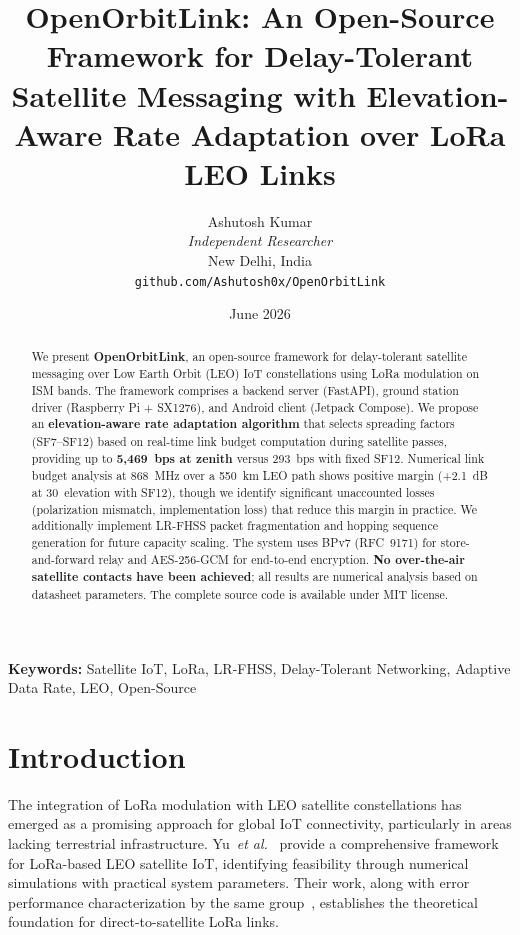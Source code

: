 \documentclass[11pt,a4paper]{article}
\title{\textbf{OpenOrbitLink: An Open-Source Framework for Delay-Tolerant Satellite Messaging with Elevation-Aware Rate Adaptation over LoRa LEO Links}}
\author{
  Ashutosh Kumar\\
  \textit{Independent Researcher}\\
  New Delhi, India\\
  \texttt{github.com/Ashutosh0x/OpenOrbitLink}
}
\date{June 2026}
\begin{document}
\maketitle

\begin{abstract}
We present \textbf{OpenOrbitLink}, an open-source framework for delay-tolerant satellite messaging over Low Earth Orbit (LEO) IoT constellations using LoRa modulation on ISM bands. The framework comprises a backend server (FastAPI), ground station driver (Raspberry Pi + SX1276), and Android client (Jetpack Compose). We propose an \textbf{elevation-aware rate adaptation algorithm} that selects spreading factors (SF7--SF12) based on real-time link budget computation during satellite passes, providing up to \textbf{5,469~bps at zenith} versus 293~bps with fixed SF12. Numerical link budget analysis at 868~MHz over a 550~km LEO path shows positive margin (+2.1~dB at 30\textdegree\ elevation with SF12), though we identify significant unaccounted losses (polarization mismatch, implementation loss) that reduce this margin in practice. We additionally implement LR-FHSS packet fragmentation and hopping sequence generation for future capacity scaling. The system uses BPv7 (RFC~9171) for store-and-forward relay and AES-256-GCM for end-to-end encryption. \textbf{No over-the-air satellite contacts have been achieved}; all results are numerical analysis based on datasheet parameters. The complete source code is available under MIT license.
\end{abstract}

\textbf{Keywords:} Satellite IoT, LoRa, LR-FHSS, Delay-Tolerant Networking, Adaptive Data Rate, LEO, Open-Source

\section{Introduction}
\label{sec:intro}

The integration of LoRa modulation with LEO satellite constellations has emerged as a promising approach for global IoT connectivity, particularly in areas lacking terrestrial infrastructure. Yu~\emph{et al.}~\cite{yu2026framework} provide a comprehensive framework for LoRa-based LEO satellite IoT, identifying feasibility through numerical simulations with practical system parameters. Their work, along with error performance characterization by the same group~\cite{yu2026error}, establishes the theoretical foundation for direct-to-satellite LoRa links.
\end{document}
